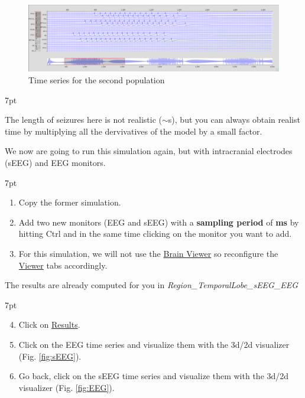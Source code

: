 \documentclass{tufte-handout}
\newenvironment{simulation}{%
  \def\FrameCommand{%
    \hspace{1pt}%
    {\color{ForestGreen}\vrule width 2pt}%
    {\color{simulationshade}\vrule width 4pt}%
    \colorbox{simulationshade}%
  }%
  \MakeFramed{\advance\hsize-\width\FrameRestore}%
  \noindent\hspace{-4.55pt}%
  \begin{adjustwidth}{}{7pt}%
  \vspace{2pt}\vspace{2pt}%
}
{%
  \vspace{2pt}\end{adjustwidth}\endMakeFramed%
}
\newenvironment{blah}{%
  \def\FrameCommand{%
    \hspace{1pt}%
    {\color{DarkOrange}\vrule width 2pt}%
    {\color{PeachPuff}\vrule width 4pt}%
    \colorbox{PeachPuff}%
  }%
  \MakeFramed{\advance\hsize-\width\FrameRestore}%
  \noindent\hspace{-4.55pt}%
  \begin{adjustwidth}{}{7pt}%
  \vspace{2pt}\vspace{2pt}%
}
{%
  \vspace{2pt}\end{adjustwidth}\endMakeFramed%
}
\begin{document}
\begin{figure}[h]
  \includegraphics[width=\linewidth]{Handout_UI_ModellingAnEpilepticPatient_SecondPopulationTimeSeries}%
  \caption{Time series for the second population}%
  \label{fig:second_pop}%
\end{figure}

\begin{blah}
  \begin{enumerate}[resume]
  The length of seizures here is not realistic ($\sim$\unit[2]{s}), but you can always obtain realist time by multiplying
  all the dervivatives of the model by a small factor.
  \end{enumerate}
\end{blah}
We now are going to run this simulation again, but with intracranial electrodes (sEEG) and EEG monitors.

\begin{simulation}
  \begin{enumerate}
  \item Copy the former simulation.
  \item Add two new monitors (EEG and sEEG) with a \textbf{sampling period} of \textbf{\unit[1]{ms}} by hitting Ctrl and in the same time clicking on the monitor
  you want to add.
  \item For this simulation, we will not use the \underline{Brain Viewer} so reconfigure the \underline{Viewer} tabs accordingly.
\end{enumerate}
\end{simulation}

The results are already computed for you in \textit{Region\_TemporalLobe\_sEEG\_EEG}

\begin{simulation}
  \begin{enumerate}
    \setcounter{enumi}{3}
  \item Click on \underline{Results}.
  \item Click on the EEG time series and visualize them with the 3d/2d visualizer (Fig. \ref{fig:sEEG}).
  \item Go back, click on the sEEG time series and visualize them with the 3d/2d visualizer (Fig. \ref{fig:EEG}).
\end{enumerate}
\end{simulation}
\end{document}
